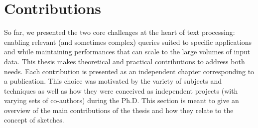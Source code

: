  \section{Contributions}\label{intro:sec:contrib}


So far, we presented the two core challenges at the heart of text processing: enabling relevant (and sometimes complex) queries suited to specific applications and while maintaining performances that can scale to the large volumes of input data.
%
This thesis makes theoretical and practical contributions to address both needs. 
Each contribution is presented as an independent chapter corresponding to a publication. This choice was motivated by the variety of subjects and techniques as well as how they were conceived as independent projects (with varying sets of co-authors) during the Ph.D. This section is meant to give an overview of the main contributions of the thesis and how they relate to the concept of sketches.


